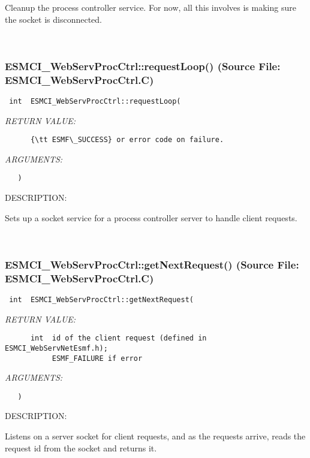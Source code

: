       Cleanup the process controller service.  For now, all this involves is
      making sure the socket is disconnected.
   
 
\mbox{}\hrulefill\
 
\subsubsection{ESMCI\_WebServProcCtrl::requestLoop() (Source File: ESMCI\_WebServProcCtrl.C)}


  
\begin{verbatim} int  ESMCI_WebServProcCtrl::requestLoop(\end{verbatim}{\em RETURN VALUE:}
\begin{verbatim}      {\tt ESMF\_SUCCESS} or error code on failure.\end{verbatim}{\em ARGUMENTS:}
\begin{verbatim}   )\end{verbatim}
{\sf DESCRIPTION:\\ }


      Sets up a socket service for a process controller server to handle
      client requests.
   
 
\mbox{}\hrulefill\
 
\subsubsection{ESMCI\_WebServProcCtrl::getNextRequest() (Source File: ESMCI\_WebServProcCtrl.C)}


  
\begin{verbatim} int  ESMCI_WebServProcCtrl::getNextRequest(\end{verbatim}{\em RETURN VALUE:}
\begin{verbatim}      int  id of the client request (defined in ESMCI_WebServNetEsmf.h);
           ESMF_FAILURE if error\end{verbatim}{\em ARGUMENTS:}
\begin{verbatim}   )\end{verbatim}
{\sf DESCRIPTION:\\ }


      Listens on a server socket for client requests, and as the requests
      arrive, reads the request id from the socket and returns it.
   
